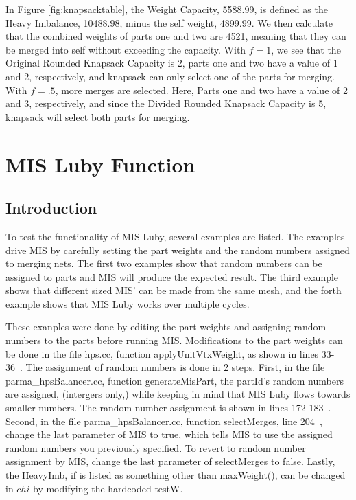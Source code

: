 \documentclass[a4paper]{article}
\begin{document}

In Figure \ref{fig:knapsacktable}, the Weight Capacity, 5588.99, is defined as the Heavy Imbalance, 10488.98, minus the self weight, 4899.99. We then calculate that the combined weights of parts one and two are 4521, meaning that they can be merged into self without exceeding the capacity. 
With $f=1$, we see that the Original Rounded Knapsack Capacity is 2, parts one and two have a value of 1 and 2, respectively, and knapsack can only select one of the parts for merging. 
With $f=.5$, more merges are selected. Here, Parts one and two have a value of 2 and 3, respectively, and since the Divided Rounded Knapsack Capacity is 5, knapsack will select both parts for merging.

\section{MIS Luby Function}
\label{sec:misluby}

\subsection{Introduction}

To test the functionality of MIS Luby, several examples are listed. The examples drive MIS by carefully setting the part weights and the random numbers assigned to merging nets.  The first two examples show that random numbers can be assigned to parts and MIS will produce the expected result. The third example shows that different sized MIS' can be made from the same mesh, and the forth example shows that MIS Luby works over multiple cycles.

These exanples were done by editing the part weights and assigning random numbers to the parts before running MIS. Modifications to the part weights can be done in the file hps.cc, function applyUnitVtxWeight, as shown in lines 33-36~\cite{scorecGH}. The assignment of random numbers is done in 2 steps. First, in the file parma\_hpsBalancer.cc, function generateMisPart, the partId's random numbers are assigned, (intergers only,) while keeping in mind that MIS Luby flows towards smaller numbers. The random number assignment is shown  in lines 172-183~\cite{scorecGH}. Second, in the file parma\_hpsBalancer.cc, function selectMerges, line 204~\cite{scorecGH}, change the last parameter of MIS to true, which tells MIS to use the assigned random numbers you previously specified. To revert to random number assignment by MIS, change the last parameter of selectMerges to false. Lastly, the HeavyImb, if is listed as something other than maxWeight(), can be changed in $chi$ by modifying the hardcoded testW.
\end{document}
